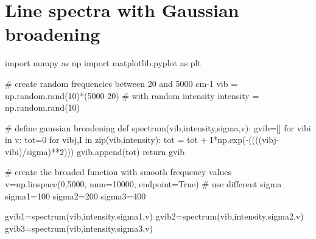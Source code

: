 \documentclass[
  letterpaper,
  DIV=11,
  numbers=noendperiod]{scrreprt}
\newenvironment{Shaded}{\begin{snugshade}}{\end{snugshade}}
\newcommand{\BuiltInTok}[1]{\textcolor[rgb]{0.00,0.23,0.31}{#1}}
\newcommand{\CommentTok}[1]{\textcolor[rgb]{0.37,0.37,0.37}{#1}}
\newcommand{\ControlFlowTok}[1]{\textcolor[rgb]{0.00,0.23,0.31}{#1}}
\newcommand{\DecValTok}[1]{\textcolor[rgb]{0.68,0.00,0.00}{#1}}
\newcommand{\ImportTok}[1]{\textcolor[rgb]{0.00,0.46,0.62}{#1}}
\newcommand{\KeywordTok}[1]{\textcolor[rgb]{0.00,0.23,0.31}{#1}}
\newcommand{\NormalTok}[1]{\textcolor[rgb]{0.00,0.23,0.31}{#1}}
\newcommand{\OperatorTok}[1]{\textcolor[rgb]{0.37,0.37,0.37}{#1}}
\newcommand{\VariableTok}[1]{\textcolor[rgb]{0.07,0.07,0.07}{#1}}
\begin{document}
\hypertarget{line-spectra-with-gaussian-broadening}{%
\section*{Line spectra with Gaussian
broadening}\label{line-spectra-with-gaussian-broadening}}


\begin{Shaded}
\begin{Highlighting}[]
\ImportTok{import}\NormalTok{ numpy }\ImportTok{as}\NormalTok{ np}
\ImportTok{import}\NormalTok{ matplotlib.pyplot }\ImportTok{as}\NormalTok{ plt}

\CommentTok{\# create random frequencies between 20 and 5000 cm{-}1 }
\NormalTok{vib }\OperatorTok{=}\NormalTok{ np.random.rand(}\DecValTok{10}\NormalTok{)}\OperatorTok{*}\NormalTok{(}\DecValTok{5000}\OperatorTok{{-}}\DecValTok{20}\NormalTok{)}
\CommentTok{\# with random intensity}
\NormalTok{intensity }\OperatorTok{=}\NormalTok{ np.random.rand(}\DecValTok{10}\NormalTok{)}

\CommentTok{\# define gaussian broadening}
\KeywordTok{def}\NormalTok{ spectrum(vib,intensity,sigma,v):}
\NormalTok{    gvib}\OperatorTok{=}\NormalTok{[]}
    \ControlFlowTok{for}\NormalTok{ vibi }\KeywordTok{in}\NormalTok{ v:}
\NormalTok{        tot}\OperatorTok{=}\DecValTok{0}
        \ControlFlowTok{for}\NormalTok{ vibj,I }\KeywordTok{in} \BuiltInTok{zip}\NormalTok{(vib,intensity):}
\NormalTok{            tot }\OperatorTok{=}\NormalTok{ tot }\OperatorTok{+}\NormalTok{ I}\OperatorTok{*}\NormalTok{np.exp(}\OperatorTok{{-}}\NormalTok{((((vibj}\OperatorTok{{-}}\NormalTok{vibi)}\OperatorTok{/}\NormalTok{sigma)}\OperatorTok{**}\DecValTok{2}\NormalTok{)))}
\NormalTok{        gvib.append(tot)}
    \ControlFlowTok{return}\NormalTok{ gvib}

\CommentTok{\# create the broaded function with smooth frequency values}
\NormalTok{v}\OperatorTok{=}\NormalTok{np.linspace(}\DecValTok{0}\NormalTok{,}\DecValTok{5000}\NormalTok{, num}\OperatorTok{=}\DecValTok{10000}\NormalTok{, endpoint}\OperatorTok{=}\VariableTok{True}\NormalTok{)}
\CommentTok{\# use different sigma}
\NormalTok{sigma1}\OperatorTok{=}\DecValTok{100}
\NormalTok{sigma2}\OperatorTok{=}\DecValTok{200}
\NormalTok{sigma3}\OperatorTok{=}\DecValTok{400}

\NormalTok{gvib1}\OperatorTok{=}\NormalTok{spectrum(vib,intensity,sigma1,v)}
\NormalTok{gvib2}\OperatorTok{=}\NormalTok{spectrum(vib,intensity,sigma2,v)}
\NormalTok{gvib3}\OperatorTok{=}\NormalTok{spectrum(vib,intensity,sigma3,v)}


\end{Highlighting}
\end{Shaded}
\end{document}
